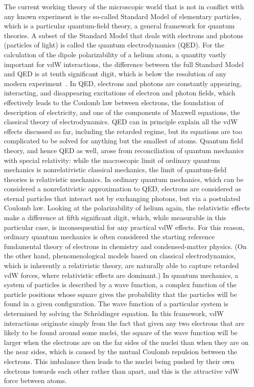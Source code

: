 The current working theory of the microscopic world that is not in conflict with any known experiment is the so-called Standard Model of elementary particles, which is a particular quantum-field theory, a general framework for quantum theories.
A subset of the Standard Model that deals with electrons and photons (particles of light) is called the quantum electrodynamics (QED).
For the calculation of the dipole polarizability of a helium atom, a quantity vastly important for vdW interactions, the difference between the full Standard Model and QED is at tenth significant digit, which is below the resolution of any modern experiment~\cite[see][Table 3.1]{Piela07}.
In QED, electrons and photons are constantly appearing, interacting, and disappearing excitations of electron and photon fields, which effectively leads to the Coulomb law between electrons, the foundation of description of electricity, and one of the components of Maxwell equations, the classical theory of electrodynamics.
QED can in principle explain all the vdW effects discussed so far, including the retarded regime, but its equations are too complicated to be solved for anything but the smallest of atoms.
Quantum field theory, and hence QED as well, arose from reconciliation of quantum mechanics with special relativity: while the macroscopic limit of ordinary quantum mechanics is nonrelativistic classical mechanics, the limit of quantum-field theories is relativistic mechanics.
In ordinary quantum mechanics, which can be considered a nonrelativistic approximation to QED, electrons are considered as eternal particles that interact not by exchanging photons, but via a postulated Coulomb law.
Looking at the polarizability of helium again, the relativistic effects make a difference at fifth significant digit, which, while measurable in this particular case, is inconsequential for any practical vdW effects.
For this reason, ordinary quantum mechanics is often considered the starting reference fundamental theory of electrons in chemistry and condensed-matter physics.
(On the other hand, phenomenological models based on classical electrodynamics, which is inherently a relativistic theory, are naturally able to capture retarded vdW forces, where relativistic effects are dominant.)
In quantum mechanics, a system of particles is described by a wave function, a complex function of the particle positions whose square gives the probability that the particles will be found in a given configuration.
The wave function of a particular system is determined by solving the Schrödinger equation.
In this framework, vdW interactions originate simply from the fact that given any two electrons that are likely to be found around some nuclei, the square of the wave function will be larger when the electrons are on the far sides of the nuclei than when they are on the near sides, which is caused by the mutual Coulomb repulsion between the electrons.
This imbalance then leads to the nuclei being pushed by their own electrons towards each other rather than apart, and this is the attractive vdW force between atoms.

